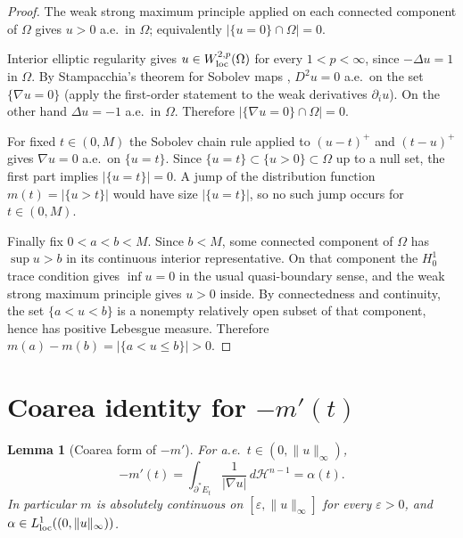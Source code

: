\documentclass[11pt]{article}
\newtheorem{lemma}[theorem]{Lemma}
\theoremstyle{definition}
\newcommand{\Om}{\Omega}
\newcommand{\eps}{\varepsilon}
\begin{document}
\begin{proof}
The weak strong maximum principle applied on each connected component of
$\Om$ gives $u>0$ a.e.\ in $\Om$; equivalently
$|\{u=0\}\cap\Om|=0$.

Interior elliptic regularity gives $u\in W^{2,p}_{\rm loc}(\Om)$ for every
$1<p<\infty$, since $-\Delta u=1$ in $\Om$.  By Stampacchia's theorem for
Sobolev maps \cite{Stampacchia1965}, $D^{2}u=0$ a.e.\ on the set
$\{\nabla u=0\}$ (apply the first-order statement to the weak derivatives
$\partial_i u$).  On the other hand $\Delta u=-1$ a.e.\ in $\Om$.  Therefore
$|\{\nabla u=0\}\cap\Om|=0$.

For fixed $t\in(0,M)$ the Sobolev chain rule applied to $(u-t)^{+}$ and
$(t-u)^{+}$ gives $\nabla u=0$ a.e.\ on $\{u=t\}$.  Since $\{u=t\}\subset
\{u>0\}\subset\Om$ up to a null set, the first part implies
$|\{u=t\}|=0$.  A jump of the distribution function $m(t)=|\{u>t\}|$
would have size $|\{u=t\}|$, so no such jump occurs for $t\in(0,M)$.

Finally fix $0<a<b<M$.  Since $b<M$, some connected component of $\Om$
has $\sup u>b$ in its continuous interior representative.  On that
component the $H^1_0$ trace condition gives $\inf u=0$ in the usual
quasi-boundary sense, and the weak strong maximum principle gives
$u>0$ inside.  By connectedness and continuity, the set
$\{a<u<b\}$ is a nonempty relatively open subset of that component,
hence has positive Lebesgue measure.  Therefore
$m(a)-m(b)=|\{a<u\le b\}|>0$.
\end{proof}

\section{Coarea identity for $-m'(t)$}\label{sec:coarea}

\begin{lemma}[Coarea form of $-m'$]\label{lem:coarea}
For a.e.\ $t\in(0,\|u\|_{\infty})$,
\begin{equation}\label{eq:L1}
   -m'(t)
   =\int_{\partial^{*}E_{t}}\frac{1}{|\nabla u|}\,d\mathcal H^{n-1}
   =\alpha(t).
\end{equation}
In particular $m$ is absolutely continuous on $[\eps,\|u\|_{\infty}]$ for
every $\eps>0$, and $\alpha\in L^{1}_{\rm loc}((0,\|u\|_{\infty}))$.
\end{lemma}
\end{document}
